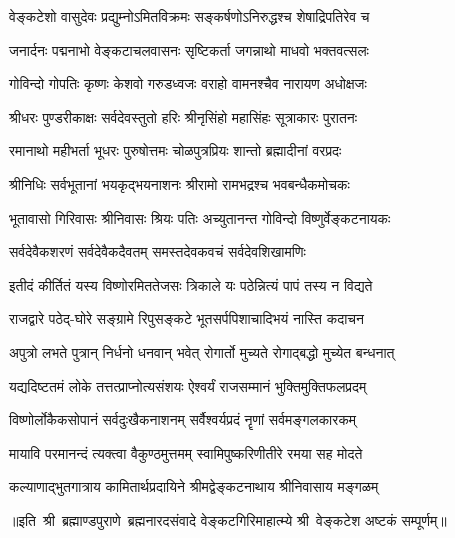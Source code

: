 

\twolineshloka
{वेङ्कटेशो वासुदेवः प्रद्युम्नोऽमितविक्रमः}
{सङ्कर्षणोऽनिरुद्धश्च शेषाद्रिपतिरेव च}

\twolineshloka
{जनार्दनः पद्मनाभो वेङ्कटाचलवासनः}
{सृष्टिकर्ता जगन्नाथो माधवो भक्तवत्सलः}

\twolineshloka
{गोविन्दो गोपतिः कृष्णः केशवो गरुडध्वजः}
{वराहो वामनश्चैव नारायण अधोक्षजः}

\twolineshloka
{श्रीधरः पुण्डरीकाक्षः सर्वदेवस्तुतो हरिः}
{श्रीनृसिंहो महासिंहः सूत्राकारः पुरातनः}

\twolineshloka
{रमानाथो महीभर्ता भूधरः पुरुषोत्तमः}
{चोळपुत्रप्रियः शान्तो ब्रह्मादीनां वरप्रदः}

\twolineshloka
{श्रीनिधिः सर्वभूतानां भयकृद्भयनाशनः}
{श्रीरामो रामभद्रश्च भवबन्धैकमोचकः}

\twolineshloka
{भूतावासो गिरिवासः श्रीनिवासः श्रियः पतिः}
{अच्युतानन्त गोविन्दो विष्णुर्वेङ्कटनायकः}

\twolineshloka
{सर्वदेवैकशरणं सर्वदेवैकदैवतम्}
{समस्तदेवकवचं सर्वदेवशिखामणिः}

\twolineshloka
{इतीदं कीर्तितं यस्य विष्णोरमिततेजसः}
{त्रिकाले यः पठेन्नित्यं पापं तस्य न विद्यते}

\twolineshloka
{राजद्वारे पठेद्-घोरे सङ्ग्रामे रिपुसङ्कटे}
{भूतसर्पपिशाचादिभयं नास्ति कदाचन}

\twolineshloka
{अपुत्रो लभते पुत्रान् निर्धनो धनवान् भवेत्}
{रोगार्तो मुच्यते रोगाद्बद्धो मुच्येत बन्धनात्}

\twolineshloka
{यद्यदिष्टतमं लोके तत्तत्प्राप्नोत्यसंशयः}
{ऐश्वर्यं राजसम्मानं भुक्तिमुक्तिफलप्रदम्}

\twolineshloka
{विष्णोर्लोकैकसोपानं सर्वदुःखैकनाशनम्}
{सर्वैश्वर्यप्रदं नॄणां सर्वमङ्गलकारकम्}

\twolineshloka
{मायावि परमानन्दं त्यक्त्वा वैकुण्ठमुत्तमम्}
{स्वामिपुष्करिणीतीरे रमया सह मोदते}

\twolineshloka
{कल्याणाद्भुतगात्राय कामितार्थप्रदायिने}
{श्रीमद्वेङ्कटनाथाय श्रीनिवासाय मङ्गळम्}

॥इति~श्री~ब्रह्माण्डपुराणे~ब्रह्मनारदसंवादे वेङ्कटगिरिमाहात्म्ये श्री~वेङ्कटेश अष्टकं सम्पूर्णम्॥